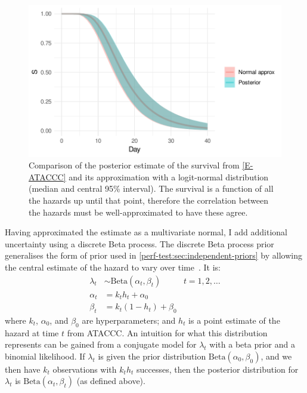 \documentclass[thesis.tex]{subfiles}
\begin{document}
\begin{figure}
  \centering \includegraphics{cis-perfect-testing/ataccc-approximation-survival}
  \caption[Approximating the ATACCC posterior survival as a logit-normal]{Comparison of the posterior estimate of the survival from \cref{E-ATACCC} and its approximation with a logit-normal distribution (median and central 95\% interval). The survival is a function of all the hazards up until that point, therefore the correlation between the hazards must be well-approximated to have these agree. \label{perf-test:fig:approximate-ATACCC-survival}}
\end{figure}

Having approximated the estimate as a multivariate normal, I add additional uncertainty using a discrete Beta process.
The discrete Beta process prior generalises the form of prior used in \cref{perf-test:sec:independent-priors} by allowing the central estimate of the hazard to vary over time~\autocites{ibrahimBayesian}{sunStatisticala}.
It is:
\begin{align}
  \lambda_t &\sim \text{Beta}(\alpha_t, \beta_t) &t = 1, 2, \dots \\
  \alpha_t &= k_t h_t + \alpha_0 \\
  \beta_t &= k_t (1 - h_t) + \beta_0
\end{align}
where $k_t$, $\alpha_0$, and $\beta_0$ are hyperparameters; and $h_t$ is a point estimate of the hazard at time $t$ from ATACCC.
An intuition for what this distribution represents can be gained from a conjugate model for $\lambda_t$ with a beta prior and a binomial likelihood.
If $\lambda_t$ is given the prior distribution $\text{Beta}(\alpha_0, \beta_0)$, and we then have $k_t$ observations with $k_t h_t$ successes, then the posterior distribution for $\lambda_t$ is $\text{Beta}(\alpha_t, \beta_t)$ (as defined above).
\end{document}
